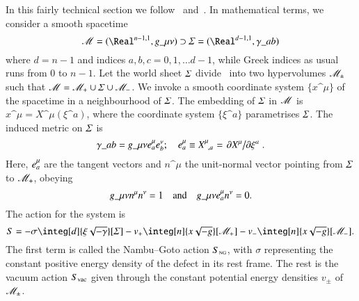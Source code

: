 In this fairly technical section we follow~\citet{garrigaPerturbationsDomainWalls1991} and~\citet{ishibashiEquationMotionDomain1999}. %
In mathematical terms, we consider a smooth spacetime
\begin{equation}
    \Manifold = (\Real^{n-1,1}, g\_{\mu\nu}) \supset \hypsurf=(\Real^{d-1,1}, \gamma\_{ab})
\end{equation}
where $d = n-1$ and indices $a,b,c =0,1,\dots d-1$, while Greek indices as usual runs from 0 to $n-1$. Let the world sheet $\varSigma$ divide \Manifold~into two hypervolumes $\mathscr{M}_{\pm}$ such that $\mathscr{M} = \mathscr{M}_+ \cup  \varSigma \cup \mathscr{M}_-$. 
We invoke a smooth coordinate system $\{x\^\mu\}$ of the spacetime in a neighbourhood of $\varSigma$. The embedding of $\varSigma$ in $\mathscr{M}$ is $x\^\mu = X\^\mu(\xi\^a)$, where the coordinate system $\{\xi\^a\}$ parametrises $\varSigma$. 
The induced metric on $\varSigma$ is
\begin{equation}\label{eq:pertwalls:thinwall:induced_metric}
    \gamma\_{ab} = g\_{\mu\nu} e\indices*{^\mu_{a}} e\indices*{^\nu_{b}}; \quad e\indices*{^\mu_{a}}\equiv X\indices{^\mu_{,a}}= \pdv*{X\^\mu}{\xi\^a}.%
\end{equation}
%
Here, $e\indices*{^\mu_a}$ are the tangent vectors and $n\^\mu$ the unit-normal vector pointing from $\varSigma$ to $\mathscr{M}_+$, obeying
\begin{equation}
    g\_{\mu\nu} n\^\mu n\^\nu = 1  \quad \text{and}\quad  g\_{\mu\nu} e\indices*{^\mu_a} n\^\nu = 0.
\end{equation}
The action for the system is~\citep{ishibashiEquationMotionDomain1999}
\begin{equation}\label{eq:pertwalls:eom_wall:total_action}
    S = - \sigma \integ[d]{\xi\sqrt{-\gamma}}[\hypsurf] %
    - v_+ \integ[n]{x\sqrt{-g}}[\mathscr{M}_+] %
    - v_- \integ[n]{x\sqrt{-g}}[\mathscr{M}_-]. %
\end{equation}
The first term is called the Nambu--Goto action $S_{\text{\tiny{NG}}}$, with $\sigma$ representing the constant positive energy density of the defect in its rest frame. The rest is the vacuum action $S_\mathrm{vac}$ given through the constant potential energy densities $v_\pm$ of $\mathscr{M}_\pm$. %

